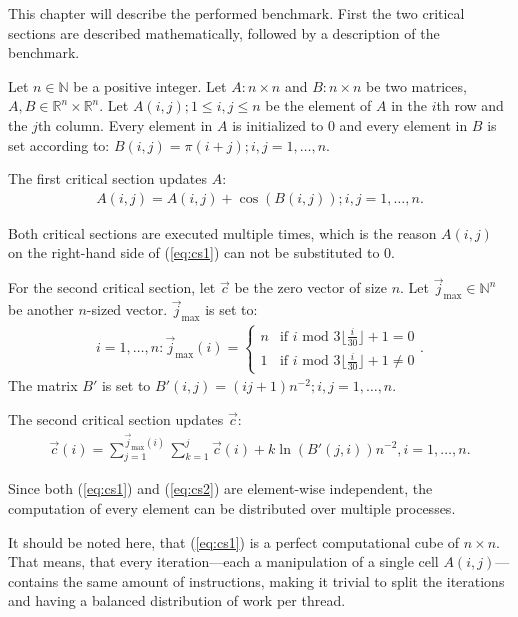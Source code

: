 \documentclass[twoside,11pt]{article}
\begin{document}
This chapter will describe the performed benchmark.
First the two critical sections are described
mathematically, followed by a description of the benchmark.

Let $n \in \mathbb{N}$ be a positive integer.
Let $A: n \times n$ and $B: n \times n$ be two matrices,
$A, B \in \mathbb{R}^n \times \mathbb{R}^n$.
Let $A(i, j); 1 \leq i, j \leq n$ be the element of $A$ in
the $i$th row and the $j$th column.
Every element in $A$ is initialized to 0 and every element
in $B$ is set according to:
$B(i, j) = \pi(i+j); i,j=1,\dots,n$.

The first critical section updates $A$:
\begin{align}
  \label{eq:cs1}
  A(i, j) = A(i, j) + \cos(B(i, j)); i,j=1,\dots,n.
\end{align}

Both critical sections are executed multiple times, which
is the reason $A(i, j)$ on the right-hand side of
(\ref{eq:cs1}) can not be substituted to 0.

\def\jmax{\vec{j}_{\text{max} }}

For the second critical section,
let $\vec{c}$ be the zero vector of size $n$.
Let $\jmax \in \mathbb{N}^n$ be another $n$-sized vector.
$\jmax$ is set to:
\begin{align}
  \label{eq:jmax}
  i=1,\dots,n: \jmax(i) =
  \begin{cases}
    n &\text{if } i \text{ mod }
       3\lfloor \frac{i}{30} \rfloor + 1 = 0 \\
    1 &\text{if } i \text{ mod }
       3\lfloor \frac{i}{30} \rfloor + 1 \neq 0
  \end{cases}.
\end{align}
The matrix $B'$ is set to $B'(i, j) = (ij + 1)n^{-2};
i,j = 1,\dots,n$.

The second critical section updates $\vec{c}$:
\begin{align}
  \label{eq:cs2}
  \vec{c}(i) = \sum_{j=1}^{\jmax(i)}\sum_{k=1}^{j}
    \vec{c}(i) + k\ln(B'(j, i))n^{-2}, i=1,\dots,n.
\end{align}

Since both (\ref{eq:cs1}) and (\ref{eq:cs2}) are
element-wise independent, the computation of every element
can be distributed over multiple processes.

It should be noted here, that (\ref{eq:cs1}) is a perfect
computational cube of $n \times n$.
That means, that every iteration---each a manipulation
of a single cell $A(i, j)$---contains the same amount of
instructions, making it trivial to split the iterations
and having a balanced distribution of work per thread.
\end{document}
